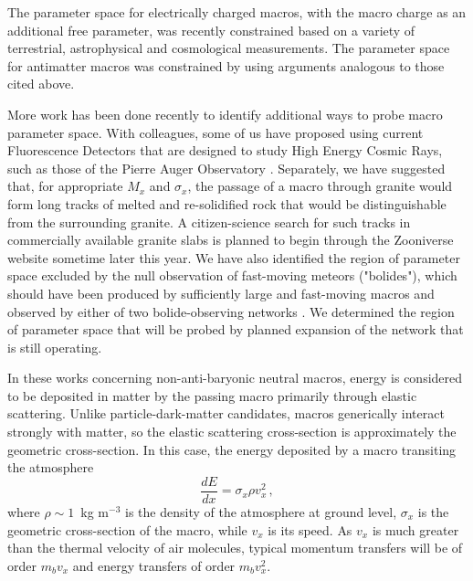 \documentclass[%
 reprint,
 amsmath,amssymb,
 aps,
]{revtex4-2}
\newcommand{\vtwo}[1]{{\color{black} #1}}
\begin{document}
    The parameter space for electrically charged macros, with the macro charge as an additional free parameter, was recently constrained \vtwo{\citep{Sidhu2020charge}} based on a variety of terrestrial, astrophysical and cosmological measurements. The parameter space for antimatter macros was constrained by \vtwo{\citet{Sidhu2020anti}} using arguments analogous to those cited \vtwo{above}.

    More work has been done recently to identify additional ways to probe macro parameter space. With colleagues, some of us have proposed \vtwo{\citep{Sidhu2018auv}} using current Fluorescence Detectors that are designed to study High Energy Cosmic Rays, such as those of the Pierre Auger Observatory \vtwo{\citep{Abraham2010}}. Separately, we have suggested \vtwo{\citep{Sidhu2019granite}} that, for appropriate $M_x$ and $\sigma_x$, the passage of a macro through granite would form long tracks of melted and re-solidified rock that would be distinguishable from the surrounding granite. A citizen-science search for such tracks in commercially available granite slabs is planned to begin through the Zooniverse website sometime later this year. We have also identified the region of parameter space excluded by the null observation of fast-moving meteors ("bolides"), which should have been produced by sufficiently large and fast-moving macros and observed by either of two bolide-observing networks \vtwo{\citep{Sidhu2019bolide}}. We determined the region of parameter space that will be probed by planned expansion of the network that is still operating.

    In these works concerning non-anti-baryonic neutral macros, energy is considered to be deposited in matter by the passing macro primarily through elastic scattering. \vtwo{Unlike particle-dark-matter candidates, macros generically interact strongly with matter, so the elastic scattering cross-section is approximately the geometric cross-section.} In this case, the energy deposited by a macro transiting the atmosphere 
    \begin{equation}\label{eq:dedx}
        \frac{dE}{dx} = \sigma_x \rho v_x^2\,,
    \end{equation}
    where $\rho \sim 1\,$ kg m$^{-3}$ is the density of the atmosphere at ground level, $\sigma_x$ is the \vtwo{geometric} cross-section of the macro, while $v_x$ is its speed. \vtwo{As $v_x$ is much greater than the thermal velocity of air molecules, typical momentum transfers will be of order $m_b v_{x}$ and energy transfers of order $m_b v_{x}^2$.}
\end{document}
